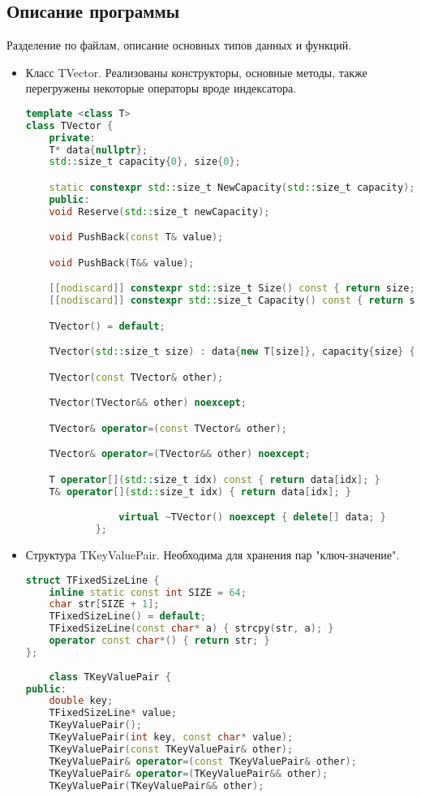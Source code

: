 \documentclass[12pt]{article}
\begin{document}
\subsection*{Описание программы}

Разделение по файлам, описание основных типов данных и функций. \\
\begin{itemize}
    \item
        Класс TVector. Реализованы конструкторы, основные методы, также перегружены некоторые операторы вроде индексатора.
        \begin{lstlisting}[language=C++]
template <class T>
class TVector {
    private:
    T* data{nullptr};
    std::size_t capacity{0}, size{0};

    static constexpr std::size_t NewCapacity(std::size_t capacity);
    public:
    void Reserve(std::size_t newCapacity);

    void PushBack(const T& value);

    void PushBack(T&& value);

    [[nodiscard]] constexpr std::size_t Size() const { return size; }
    [[nodiscard]] constexpr std::size_t Capacity() const { return size; }

    TVector() = default;

    TVector(std::size_t size) : data{new T[size]}, capacity{size} {}

    TVector(const TVector& other);

    TVector(TVector&& other) noexcept;

    TVector& operator=(const TVector& other);

    TVector& operator=(TVector&& other) noexcept;

    T operator[](std::size_t idx) const { return data[idx]; }
    T& operator[](std::size_t idx) { return data[idx]; }

                virtual ~TVector() noexcept { delete[] data; }
            };
        \end{lstlisting}
    \item
     Структура TKeyValuePair. Необходима для хранения пар "ключ-значение".
        \begin{lstlisting}[language=C++]
struct TFixedSizeLine {
    inline static const int SIZE = 64;
    char str[SIZE + 1];
    TFixedSizeLine() = default;
    TFixedSizeLine(const char* a) { strcpy(str, a); }
    operator const char*() { return str; }
};
        
    class TKeyValuePair {
public:
    double key;
    TFixedSizeLine* value;
    TKeyValuePair();
    TKeyValuePair(int key, const char* value);
    TKeyValuePair(const TKeyValuePair& other);
    TKeyValuePair& operator=(const TKeyValuePair& other);
    TKeyValuePair& operator=(TKeyValuePair&& other);
    TKeyValuePair(TKeyValuePair&& other);


\end{lstlisting}
\end{itemize}
\end{document}
